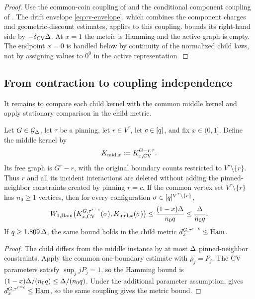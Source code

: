 \begin{proof}
Use the common-coin coupling of
 and the conditional component
coupling of .
The drift envelope \eqref{eq:cv-envelope}, which combines the component
charges and geometric-discount estimates, applies to this coupling.
 bounds its right-hand side by
$-\delta_{\rm CV}\Delta$.  At $x=1$ the metric is Hamming and the active
graph is empty.  The endpoint $x=0$ is handled below by continuity of the
normalized child laws, not by assigning values to $0^0$ in the active
representation.
\end{proof}

\subsection{From contraction to coupling independence}

It remains to compare each child kernel with the common middle kernel and
apply stationary comparison in the child metric.

\begin{lemma}
\label{lem:cv-child-middle}
Let \(G\in\mathcal{G}_{\Delta}\), let \(\tau\) be a pinning, let \(r\in V^\tau\),
let \(c\in[q]\), and fix \(x\in(0,1]\). Define the middle kernel by
\[
  K_{{\rm mid},x}:=K_{x,\mathrm{CV}}^{G-r,\tau}.
\]
Its free graph is \(G^\tau-r\), with the original boundary counts restricted
to \(V^\tau\setminus\{r\}\). Thus \(r\) and all its incident interactions
are deleted without adding the pinned-neighbor constraints created by
pinning \(r=c\). If the common vertex set
\(V^\tau\setminus\{r\}\) has \(n_0\ge1\) vertices, then for every configuration
\(\sigma\in[q]^{V^\tau\setminus\{r\}}\),
\[
  W_{1,\operatorname{Ham}}\bigl(K_{x,\mathrm{CV}}^{G,\tau^{r=c}}(\sigma),
             K_{{\rm mid},x}(\sigma)\bigr)
       \le\frac{(1-x)\Delta}{n_0q}
       \le\frac{\Delta}{n_0q}.
\]
If $q\ge1.809\,\Delta$, the same bound holds in the child metric
$d_x^{G,\tau^{r=c}}\le\operatorname{Ham}$.
\end{lemma}

\begin{proof}
The child differs from the middle instance by at most \(\Delta\) pinned-neighbor
constraints.  Apply the common one-boundary estimate
 with \(\rho_j=P_j\).  The CV parameters
satisfy \(\sup_j jP_j=1\), so the Hamming bound is
\((1-x)\Delta/(n_0q)\le\Delta/(n_0q)\).  Under the additional parameter
assumption,  gives
\(d_x^{G,\tau^{r=c}}\le\operatorname{Ham}\), so the same coupling gives the
metric bound.
\end{proof}

